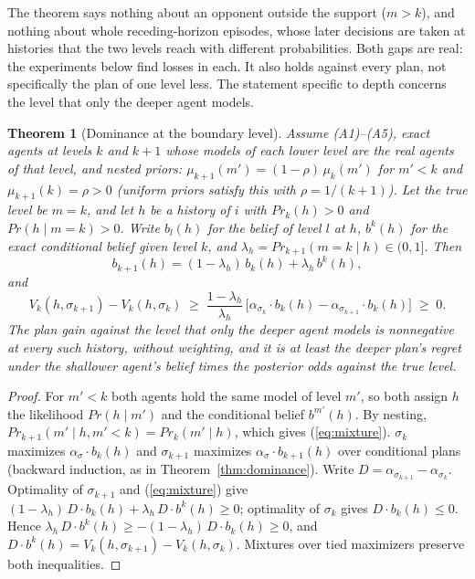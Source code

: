 \documentclass{article}
\renewcommand{\Pr}{\mathit{Pr}}
\newtheorem{theorem}{Theorem}
\begin{document}
The theorem says nothing about an opponent outside the support ($m > k$), and nothing about whole receding-horizon episodes, whose later decisions are taken at histories that the two levels reach with different probabilities. Both gaps are real: the experiments below find losses in each. It also holds against every plan, not specifically the plan of one level less. The statement specific to depth concerns the level that only the deeper agent models.

\begin{theorem}[Dominance at the boundary level]\label{thm:boundary}
Assume (A1)--(A5), exact agents at levels $k$ and $k+1$ whose models of each lower level are the real agents of
that level, and \emph{nested priors}: $\mu_{k+1}(m')=(1-\rho)\,\mu_k(m')$ for $m'<k$ and $\mu_{k+1}(k)=\rho>0$
(uniform priors satisfy this with $\rho=1/(k+1)$). Let the true level be $m=k$, and let $h$ be a history of $i$
with $\Pr_k(h)>0$ and $\Pr(h\mid m=k)>0$. Write $b_l(h)$ for the belief of level $l$ at $h$,
$b^k(h)$ for the exact conditional belief given level $k$, and $\lambda_h=\Pr_{k+1}(m=k\mid h)\in(0,1]$. Then
\begin{equation}\label{eq:mixture}
b_{k+1}(h)=(1-\lambda_h)\,b_k(h)+\lambda_h\,b^k(h),
\end{equation}
and
\[
V_k(h,\sigma_{k+1})-V_k(h,\sigma_k)\;\ge\;\frac{1-\lambda_h}{\lambda_h}\,
\big[\alpha_{\sigma_k}\cdot b_k(h)-\alpha_{\sigma_{k+1}}\cdot b_k(h)\big]\;\ge\;0 .
\]
The plan gain against the level that only the deeper agent models is nonnegative at every such history, without
weighting, and it is at least the deeper plan's regret under the shallower agent's belief times the posterior
odds against the true level.
\end{theorem}
\begin{proof}
For $m'<k$ both agents hold the same model of level $m'$, so both assign $h$ the likelihood $\Pr(h\mid m')$
and the conditional belief $b^{m'}(h)$. By nesting, $\Pr_{k+1}(m'\mid h,m'<k)=\Pr_k(m'\mid h)$, which gives
(\ref{eq:mixture}). $\sigma_k$ maximizes $\alpha_\sigma\cdot b_k(h)$ and $\sigma_{k+1}$ maximizes
$\alpha_\sigma\cdot b_{k+1}(h)$ over conditional plans (backward induction, as in
Theorem~\ref{thm:dominance}). Write $D=\alpha_{\sigma_{k+1}}-\alpha_{\sigma_k}$. Optimality of $\sigma_{k+1}$
and (\ref{eq:mixture}) give $(1-\lambda_h)\,D\cdot b_k(h)+\lambda_h\,D\cdot b^k(h)\ge0$; optimality of
$\sigma_k$ gives $D\cdot b_k(h)\le0$. Hence $\lambda_h\,D\cdot b^k(h)\ge-(1-\lambda_h)\,D\cdot b_k(h)\ge0$, and
$D\cdot b^k(h)=V_k(h,\sigma_{k+1})-V_k(h,\sigma_k)$. Mixtures over tied maximizers preserve both inequalities.
\end{proof}
\end{document}
